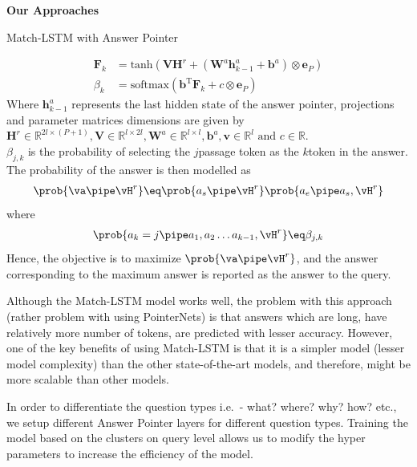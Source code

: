 \documentclass{article}
\begin{document}
\begin{psection}{\textbf{Our Approaches}}
\begin{psubsection}{Match-LSTM with Answer Pointer}
\begin{enumerate}[label=\bt{\theenumi.}]
			    \begin{align*}
                          \boldsymbol{F}_k &= \text{tanh} \left(\textbf{V} \textbf{H}^r + (\textbf{W}^a \boldsymbol{h}_{k - 1}^a + \boldsymbol{b}^a) \otimes \boldsymbol{e}_P \right) \\
                          \beta_k &= \text{softmax} \left( \boldsymbol{b}^\text{T} \boldsymbol{F}_k + c \otimes \boldsymbol{e}_P \right)
                \end{align*}
			Where $\boldsymbol{h}_{k - 1}^a$ represents the last hidden state of the answer pointer, projections and parameter matrices dimensions are given by $\textbf{H}^r \in \mathbb{R}^{2l\times(P+1)}, \textbf{V} \in \mathbb{R}^{l\times 2l}, \boldsymbol{W}^a \in \mathbb{R}^{l \times l}, \textbf{b}^a, \textbf{v} \in \mathbb{R}^l \text{ and } c \in \mathbb{R}$.\\
			$\beta_{j, k}$ is the probability of selecting the $j$\tth passage token as the $k$\tth token in the answer. The probability of the answer is then modelled as
				\begin{align*}
					\prob{\va \pipe \vH^r}	\eq	\prob{a_s \pipe \vH^r} \prob{a_e \pipe a_s, \vH^r}
				\end{align*}
				where
				\begin{align*}
					\prob{a_k = j \pipe a_1, a_2 \dots a_{k - 1}, \vH^r}	\eq	\beta_{j, k}
				\end{align*}
				Hence, the objective is to maximize $\prob{\va \pipe \vH^r}$, and the answer corresponding to the maximum answer is reported as the answer to the query.
		\end{enumerate}

		Although the Match-LSTM model works well, the problem with this approach (rather problem with using PointerNets) is that answers which are long, \ie have relatively more number of tokens, are predicted with lesser accuracy. However, one of the key benefits of using Match-LSTM is that it is a simpler model (lesser model complexity) than the other state-of-the-art models, and therefore, might be more scalable than other models.


		       In order to differentiate the question types i.e.\ - what? where? why? how? etc., we setup different Answer Pointer layers for different question types.
		       Training the model based on the clusters on query level allows us to modify the hyper parameters to increase the efficiency of the model.


\end{psubsection}
\end{psection}
\end{document}
